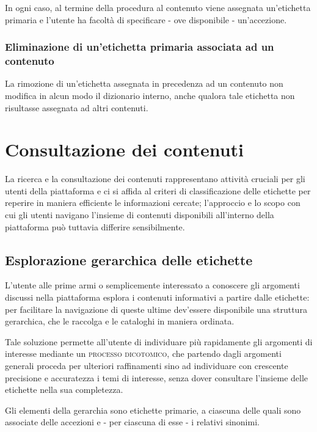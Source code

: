 \documentclass[10pt,a4paper,headinclude,footinclude,hidelinks]{scrreprt} %
\begin{document}
	In ogni caso, al termine della procedura al contenuto viene assegnata un'etichetta primaria e l'utente ha facoltà di specificare - ove disponibile - un'accezione.
	\subsubsection{Eliminazione di un'etichetta primaria associata ad un contenuto}
	La rimozione di un'etichetta assegnata in precedenza ad un contenuto non modifica in alcun modo il dizionario interno, anche qualora tale etichetta non risultasse assegnata ad altri contenuti.

	\section{Consultazione dei contenuti}
	\label{sec:stage:cls:scenari:read}
	La ricerca e la consultazione dei contenuti rappresentano attività cruciali per gli utenti della piattaforma e ci si affida al criteri di classificazione delle etichette per reperire in maniera efficiente le informazioni cercate; l'approccio e lo scopo con cui gli utenti navigano l'insieme di contenuti disponibili all'interno della piattaforma può tuttavia differire sensibilmente.
	\subsection{Esplorazione gerarchica delle etichette}
	L'utente alle prime armi o semplicemente interessato a conoscere gli argomenti discussi nella piattaforma esplora i contenuti informativi a partire dalle etichette: per facilitare la navigazione di queste ultime dev'essere disponibile una struttura gerarchica, che le raccolga e le cataloghi in maniera ordinata.

	Tale soluzione permette all'utente di individuare più rapidamente gli argomenti di interesse mediante un \textsc{processo dicotomico}, che partendo dagli argomenti generali proceda per ulteriori raffinamenti sino ad individuare con crescente precisione e accuratezza i temi di interesse, senza dover consultare l'insieme delle etichette nella sua completezza.

	Gli elementi della gerarchia sono etichette primarie, a ciascuna delle quali sono associate delle accezioni e - per ciascuna di esse - i relativi sinonimi. 
\end{document}
